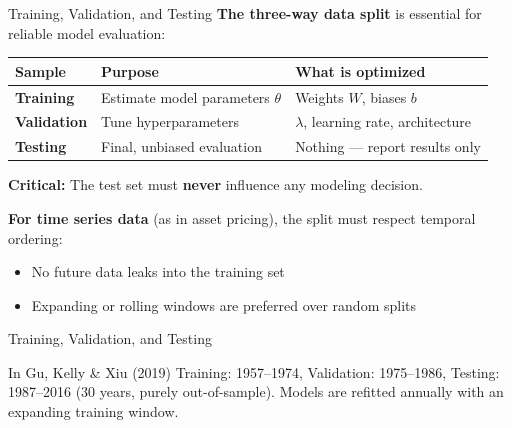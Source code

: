 \documentclass[aspectratio=169]{beamer}
\begin{document}
\begin{frame}{Training, Validation, and Testing}
\small
\textbf{The three-way data split} is essential for reliable model evaluation:

\medskip
\begin{center}
\renewcommand{\arraystretch}{1.4}
\begin{tabular}{l p{4cm} p{5cm}}
\hline
\textbf{Sample} & \textbf{Purpose} & \textbf{What is optimized} \\
\hline
\textbf{Training} & Estimate model parameters $\theta$ & Weights $W$, biases $b$ \\
\textbf{Validation} & Tune hyperparameters & $\lambda$, learning rate, architecture \\
\textbf{Testing} & Final, unbiased evaluation & Nothing --- report results only \\
\hline
\end{tabular}
\end{center}

\vspace{0.3cm}
\textbf{Critical:} The test set must \textbf{never} influence any modeling decision.

\medskip
\textbf{For time series data} (as in asset pricing), the split must respect temporal ordering:
\begin{itemize}
    \item No future data leaks into the training set
    \item Expanding or rolling windows are preferred over random splits
\end{itemize}
\end{frame}
%
%
\begin{frame}{Training, Validation, and Testing}

\begin{block}{In Gu, Kelly \& Xiu (2019)}
Training: 1957--1974, Validation: 1975--1986, Testing: 1987--2016 (30 years, purely out-of-sample). Models are refitted annually with an expanding training window.
\end{block}
\end{frame}
%
%
\end{document}
